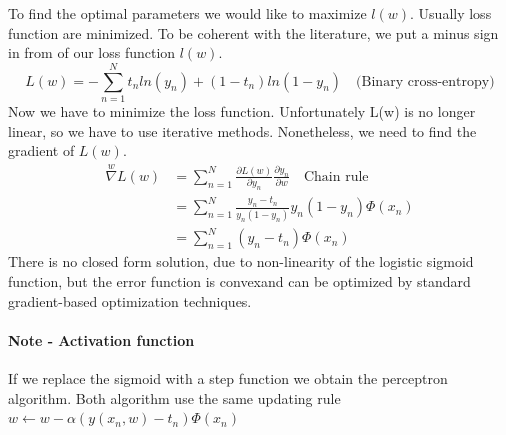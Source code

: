 \documentclass[main.tex]{subfiles}
\begin{document}
To find the optimal parameters we would like to maximize $l(w)$. Usually loss function are minimized. To be coherent with the literature, we put a minus sign in from of our loss function $l(w)$.
\begin{equation}
    L(w) = -\sum_{n=1}^N t_n ln(y_n) + (1 - t_n)ln(1 - y_n) \quad \text{(Binary cross-entropy)}
\end{equation}
Now we have to minimize the loss function. Unfortunately L(w) is no longer linear, so we have to use iterative methods. Nonetheless, we need to find the gradient of $L(w)$.
\begin{align*}
    \overset{w}{\nabla} L(w) & = \sum_{n=1}^N \frac{\partial L(w)}{\partial y_n} \frac{\partial y_n}{\partial w} \quad \text{Chain rule} \\
                             & = \sum_{n=1}^N \frac{y_n - t_n}{y_n (1 - y_n)} y_n(1-y_n)\Phi(x_n)                                        \\
                             & = \sum_{n=1}^N (y_n - t_n)\Phi(x_n)
\end{align*}
There is no closed form solution, due to non-linearity of the logistic sigmoid function, but the error function is convex\footnotemark and can be optimized by standard gradient-based optimization techniques. 

\paragraph{Note - Activation function} If we replace the sigmoid with a step function we obtain the perceptron algorithm. Both algorithm use the same updating rule $w \leftarrow w - \alpha(y(x_n, w)-t_n)\Phi(x_n)$
\end{document}
